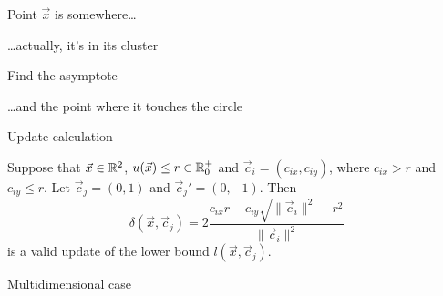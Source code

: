 \documentclass[10pt, compress]{beamer}
\newcommand{\x}{\vec{x}}
\newcommand{\cj}{\vec{c}_j}
\newcommand{\ci}{\vec{c}_i}
\newcommand{\ux}{u(\x)}
\newcommand{\lxcj}{l(\x, \cj)}
\newcommand{\deltaxcj}{\delta(\x, \cj)}
\begin{document}
\begin{frame}{Point $\x$ is somewhere\ldots}
  \begin{center}
    
  \end{center}
\end{frame}

\begin{frame}{\ldots actually, it's in its cluster}
  \begin{center}
    
  \end{center}
\end{frame}

\begin{frame}{Find the asymptote}
  \begin{center}
    
  \end{center}
\end{frame}

\begin{frame}{\ldots and the point where it touches the circle}
  \begin{center}
    
  \end{center}
\end{frame}

\begin{frame}{Update calculation}
\vspace{-0.5cm}
\begin{lemma}
Suppose that $\x \in \R^2$, $\ux \leq r \in \Rpz$ and $\ci = (c_{ix}, c_{iy})$,
where $c_{ix} > r$ and $c_{iy} \leq r$. Let $\cj=(0,1)$ and $\cj'=(0,-1)$. Then
\begin{equation*}
    \deltaxcj =
        2\frac{
            c_{ix} r
            -
            c_{iy} \sqrt{\| \ci \|^2 - r^2}
        }{
             \| \ci \|^2
        }
\end{equation*}
is a valid update of the lower bound $\lxcj$.
\end{lemma}
  \begin{center}
    
  \end{center}
\end{frame}

\begin{frame}{Multidimensional case}
  \begin{center}
    
  \end{center}
\end{frame}
\end{document}
